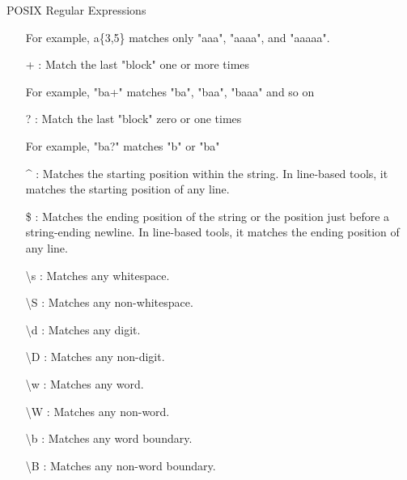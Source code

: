 \documentclass[10pt,t]{beamer}
\begin{document}
\begin{frame}[c,allowframebreaks]{POSIX Regular Expressions}
\begin{itemize}
    \item[] For example, a\{3,5\} matches only "aaa", "aaaa", and "aaaaa". 
    \item[+]: Match the last "block" one or more times 
    \item[] For example, "ba+" matches "ba", "baa", "baaa" and so on
    \item[?]: Match the last "block" zero or one times  
    \item[] For example, "ba?" matches "b" or "ba"
    \framebreak
    \item[\string^]: Matches the starting position within the string. In line-based tools, it matches the starting position of any line.
    \item[\$]: Matches the ending position of the string or the position just before a string-ending newline. In line-based tools, it matches the ending position of any line.
    \item[{\textbackslash}s]: Matches any whitespace.
    \item[{\textbackslash}S]: Matches any non-whitespace.
    \item[{\textbackslash}d]: Matches any digit.
    \item[{\textbackslash}D]: Matches any non-digit.
    \item[{\textbackslash}w]: Matches any word.
    \item[{\textbackslash}W]: Matches any non-word.
    \item[{\textbackslash}b]: Matches any word boundary.
    \item[{\textbackslash}B]: Matches any non-word boundary.
  \end{itemize}
\end{frame}
\end{document}
